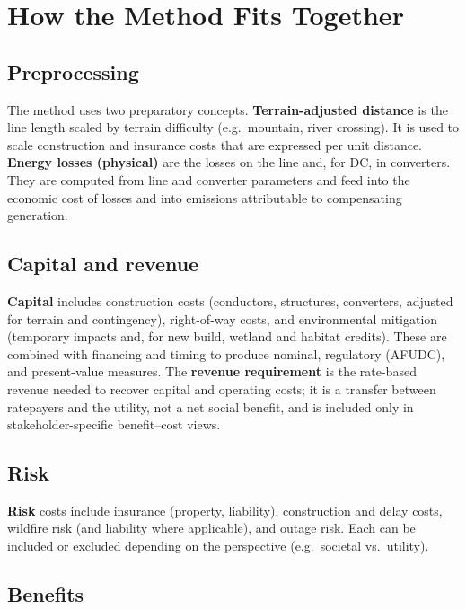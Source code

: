 \documentclass[ctcc_full_documentation.tex]{subfiles}
\begin{document}
\section{How the Method Fits Together}

\subsection{Preprocessing}

The method uses two preparatory concepts. \textbf{Terrain-adjusted distance} is the line length scaled by terrain difficulty (e.g.\ mountain, river crossing). It is used to scale construction and insurance costs that are expressed per unit distance. \textbf{Energy losses (physical)} are the losses on the line and, for DC, in converters. They are computed from line and converter parameters and feed into the economic cost of losses and into emissions attributable to compensating generation.

\subsection{Capital and revenue}

\textbf{Capital} includes construction costs (conductors, structures, converters, adjusted for terrain and contingency), right-of-way costs, and environmental mitigation (temporary impacts and, for new build, wetland and habitat credits). These are combined with financing and timing to produce nominal, regulatory (AFUDC), and present-value measures. The \textbf{revenue requirement} is the rate-based revenue needed to recover capital and operating costs; it is a transfer between ratepayers and the utility, not a net social benefit, and is included only in stakeholder-specific benefit--cost views.

\subsection{Risk}

\textbf{Risk} costs include insurance (property, liability), construction and delay costs, wildfire risk (and liability where applicable), and outage risk. Each can be included or excluded depending on the perspective (e.g.\ societal vs.\ utility).

\subsection{Benefits}
\end{document}
